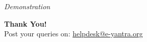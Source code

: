 \documentclass[table,10pt,red]{beamer}	%
\begin{document}
	
\begin{frame}
	\begin{huge}
		\color{red}
			\hskip4cm
				\begin{center}				
					\textit{\Huge Demonstration} \\[50pt]
				\end{center}
			\hskip3cm
		\color{black}
	\end{huge}
\end{frame}
\begin{frame}
\hskip4cm
\textbf{\LARGE Thank You!} \\[20pt]
\hskip3cm
\scriptsize Post your queries on: 
\hyperref[helpdesk@e-yantra.org]{\color{blue} helpdesk@e-yantra.org \color{black}} 
\end{frame}



	
	
\end{document}
